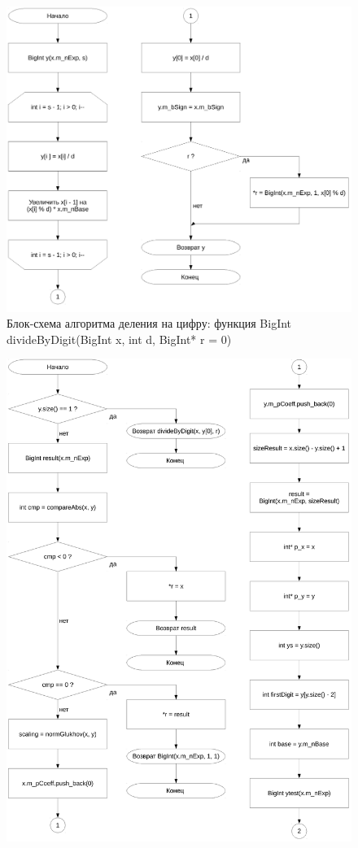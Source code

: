 \documentclass[a4paper,12pt]{article} %
\begin{document}
\begin{figure}[ht]
	\includegraphics[width=\textwidth]{lr3_divideByDigit.pdf}
	\caption{Блок-схема алгоритма деления на цифру: функция BigInt divideByDigit(BigInt x, int d, BigInt* r = 0)}
\end{figure}

\begin{figure}[ht]
	\includegraphics[width=\textwidth]{lr3_divide-1.pdf}
\end{figure}
\end{document}
